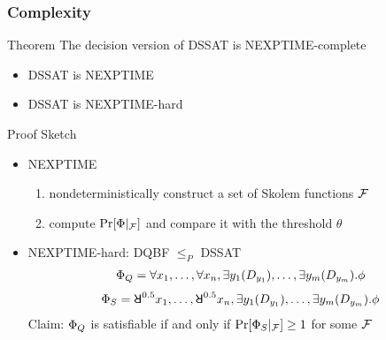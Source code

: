 \begin{frame}
  \frametitle{Complexity}
  \begin{block}{Theorem}
    The decision version of DSSAT is NEXPTIME-complete
    \pause
    \begin{itemize}
      \item DSSAT is NEXPTIME
            \pause
      \item DSSAT is NEXPTIME-hard
    \end{itemize}
  \end{block}
  \pause
  \begin{block}{Proof Sketch}
    \belowdisplayskip=0pt
    \begin{itemize}
      \item NEXPTIME
            \pause
            \begin{enumerate}
              \item nondeterministically construct a set of Skolem functions $\mathcal{F}$
                    \pause
              \item compute $\Pr[\Phi|_{\mathcal{F}}]$ and compare it with the threshold $\theta$
            \end{enumerate}
            \pause
      \item NEXPTIME-hard: DQBF $\leq_P$ DSSAT
            \pause
            \begin{align*}
              \Phi_Q=\forall x_1, \ldots, \forall x_n, \exists y_1(D_{y_1}), \ldots, \exists y_m(D_{y_m}).\phi
            \end{align*}
            \pause
            \begin{align*}
              \Qf_S=\random{0.5} x_1, \ldots, \random{0.5} x_n, \exists y_1(D_{y_1}), \ldots, \exists y_m(D_{y_m}).\pf
            \end{align*}
            \pause
            Claim: $\Phi_Q$ is satisfiable if and only if $\Pr[\Phi_S|_{\mathcal{F}}] \geq 1$ for some $\mathcal{F}$
    \end{itemize}
  \end{block}
\end{frame}